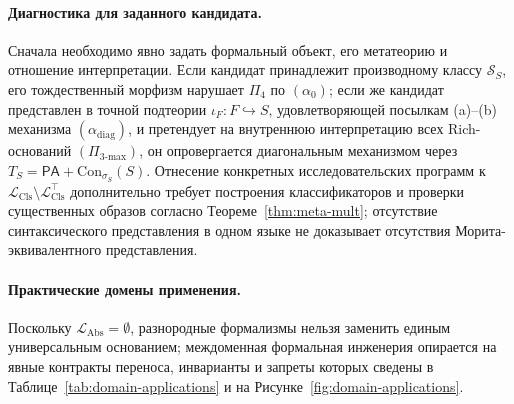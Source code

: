 \documentclass[11pt]{article}
\theoremstyle{plain}
\theoremstyle{definition}
\newcommand{\cS}{\mathcal{S}}
\newcommand{\LCls}{\mathcal{L}_{\mathrm{Cls}}}
\newcommand{\LClsMax}{\mathcal{L}_{\mathrm{Cls}}^{\top}}
\newcommand{\LAbs}{\mathcal{L}_{\mathrm{Abs}}}
\newcommand{\Con}{\mathrm{Con}}
\newcommand{\PA}{\mathsf{PA}}
\begin{document}
\paragraph{Диагностика для заданного кандидата.} Сначала необходимо явно задать формальный объект, его метатеорию и отношение интерпретации. Если кандидат принадлежит производному классу $\cS_S$, его тождественный морфизм нарушает $\Pi_4$ по $(\alpha_0)$; если же кандидат представлен в точной подтеории $\iota_F : F \hookrightarrow S$, удовлетворяющей посылкам (a)--(b) механизма $(\alpha_{\mathrm{diag}})$, и претендует на внутреннюю интерпретацию всех Rich-оснований $(\Pi_{3\text{-max}})$, он опровергается диагональным механизмом через $T_S = \PA + \Con_{\sigma_S}(S)$. Отнесение конкретных исследовательских программ к $\LCls \setminus \LClsMax$ дополнительно требует построения классификаторов и проверки существенных образов согласно Теореме~\ref{thm:meta-mult}; отсутствие синтаксического представления в одном языке не доказывает отсутствия Морита-эквивалентного представления.

\paragraph{Практические домены применения.} Поскольку $\LAbs = \emptyset$, разнородные формализмы нельзя заменить единым универсальным основанием; междоменная формальная инженерия опирается на явные контракты переноса, инварианты и запреты которых сведены в Таблице~\ref{tab:domain-applications} и на Рисунке~\ref{fig:domain-applications}.
\end{document}

